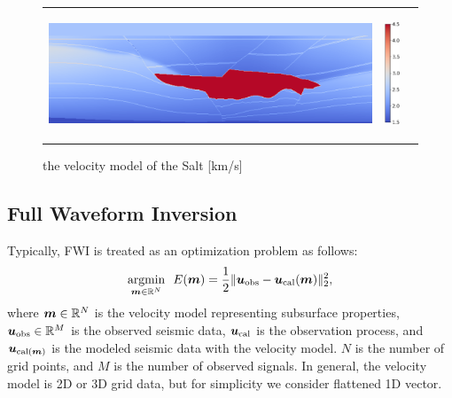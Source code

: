 \begin{figure}[htbp]
\vspace{-\baselineskip}
    \centering
    \begin{tabular}{m{110mm} m{5mm} m{0mm}}
        \begin{minipage}[b]{120mm}
            \centering
            \includegraphics[width=120mm]{public/full_true_vm}
        \end{minipage} &
        \begin{minipage}[b]{20mm}
            \centering
            \includegraphics[height=38mm]{public/color-bar}
        \end{minipage} &
    \end{tabular}
    \vspace{-3mm}
    \caption{the velocity model of the Salt [km/s]}
    \label{fig:salt-model}
\vspace{-\baselineskip}
\vspace{2mm}
\end{figure}



\subsection{Full Waveform Inversion}\label{subsec:full-waveform-inversion}
Typically, FWI is treated as an optimization problem as follows\cite{FWI0}:
\begin{equation} \label{eq:FWIObjective} \underset{\bm{m} \in \mathbb{R}^N}{\mathrm{argmin}} \ \ E(\bm{m}) = \frac {1} {2} \lVert  \bm{u}_{\mathrm{obs}} - \bm{u}_{\mathrm{cal}}(\bm{m})  \rVert _2^2, \end{equation}
where $\bm{m} \in \mathbb{R}^{N}$ is the velocity model representing subsurface properties, $\bm{u}_{\mathrm{obs}} \in \mathbb{R}^{M}$ is the observed seismic data, $\bm{u}_{\mathrm{cal}}$ is the observation process, and $\bm{u}_{\mathrm{cal}(\bm{m})}$ is the modeled seismic data with the velocity model.
$N$ is the number of grid points, and $M$ is the number of observed signals.
In general, the velocity model is 2D or 3D grid data, but for simplicity we consider flattened 1D vector.

